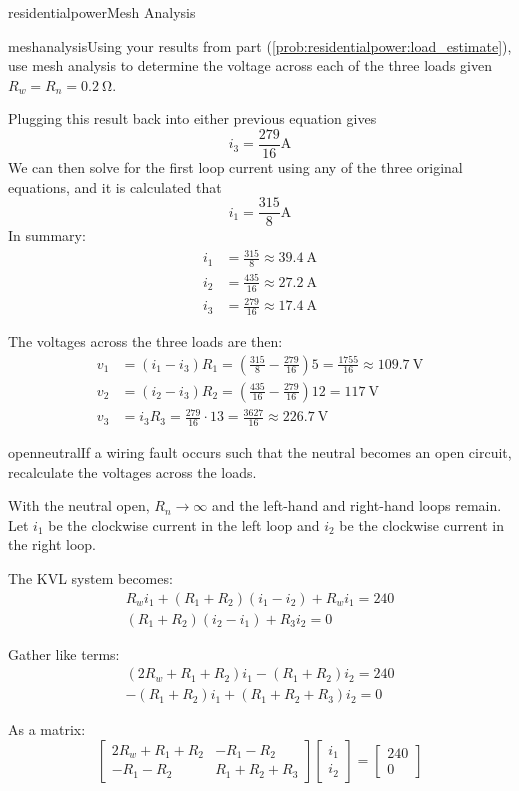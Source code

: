 \begin{mainquestion}{residentialpower}{Mesh Analysis}
\begin{partquestion}{meshanalysis}{Using your results from part (\cref{prob:residentialpower:load_estimate}), use mesh analysis to determine the voltage across each of the three loads given $R_{w}=R_{n}=\qty{0.2}{\ohm}$.}
\begin{answer}
Plugging this result back into either previous equation gives \[i_3=\frac{279}{16}\unit{\ampere}\] We can then solve for the first loop current using any of the three original equations, and it is calculated that \[i_1=\frac{315}{8}\unit{\ampere}\] 
In summary:
\begin{align*}
    i_1 &= \frac{315}{8} \approx \qty{39.4}{\ampere}\\
    i_2 &= \frac{435}{16} \approx \qty{27.2}{\ampere}\\
    i_3 &= \frac{279}{16} \approx \qty{17.4}{\ampere}
\end{align*}

The voltages across the three loads are then:
\begin{align*}
v_{1} &= (i_{1}-i_{3}) R_{1} = \left( \frac{315}{8} - \frac{279}{16} \right) 5 = \frac{1755}{16} \approx \qty{109.7}{\volt} \\
v_{2} &= (i_{2}-i_{3}) R_{2} = \left( \frac{435}{16} - \frac{279}{16} \right) 12 = \qty{117}{\volt} \\
v_{3} &= i_{3} R_{3} = \frac{279}{16} \cdot 13 = \frac{3627}{16} \approx \qty{226.7}{\volt}
\end{align*}
\end{answer}
\end{partquestion}

\begin{partquestion}{openneutral}{If a wiring fault occurs such that the neutral becomes an open circuit, recalculate the voltages across the loads.}
\begin{answer}
With the neutral open, $R_{n}\to\infty$ and the left-hand and right-hand loops remain. Let $i_{1}$ be the clockwise current in the left loop and $i_{2}$ be the clockwise current in the right loop.

The KVL system becomes:
\begin{gather*}
R_wi_1 + (R_1 + R_2)(i_1 - i_2) + R_wi_1 = 240 \\
(R_1 + R_2)(i_2 - i_1) + R_3i_2 = 0
\end{gather*}

Gather like terms:
\begin{gather*}
(2R_w + R_1 + R_2)i_1 - (R_1 + R_2)i_2 = 240 \\
- (R_1 + R_2)i_1 + (R_1 + R_2 + R_3)i_2 = 0
\end{gather*}

As a matrix:
\[
\begin{bmatrix}
2R_w + R_1 + R_2 & -R_1 -R_2\\
-R_1 -R_2 & R_1 + R_2 + R_3
\end{bmatrix}
\begin{bmatrix}
i_1 \\
i_2
\end{bmatrix}
=
\begin{bmatrix}
240 \\
0
\end{bmatrix}
\]


\end{answer}
\end{partquestion}
\end{mainquestion}
